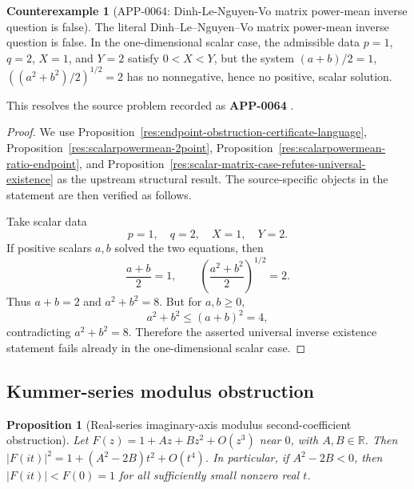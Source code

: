 \documentclass[11pt]{article}
\numberwithin{equation}{section}
\newtheorem{proposition}[theorem]{Proposition}
\theoremstyle{definition}
\newtheorem{counterexample}[theorem]{Counterexample}
\theoremstyle{remark}
\newcommand{\1}{\mathbf 1}
\begin{document}
\begin{counterexample}[APP-0064: Dinh-Le-Nguyen-Vo matrix power-mean inverse question is false]
\label{res:dlnv-matrixpowermeaninverse-scalarrefutation}
The literal Dinh--Le--Nguyen--Vo matrix power-mean inverse question is false. In the one-dimensional scalar case, the admissible data \(p=1\), \(q=2\), \(X=1\), and \(Y=2\) satisfy \(0<X<Y\), but the system \((a+b)/2=1\), \(((a^2+b^2)/2)^{1/2}=2\) has no nonnegative, hence no positive, scalar solution.



This resolves the source problem recorded as \textbf{APP-0064} \cite{app-app-0064-source}.
\end{counterexample}

\begin{proof}
We use Proposition~\ref{res:endpoint-obstruction-certificate-language}, Proposition~\ref{res:scalarpowermean-2point}, Proposition~\ref{res:scalarpowermean-ratio-endpoint}, and Proposition~\ref{res:scalar-matrix-case-refutes-universal-existence} as the upstream structural result. The source-specific objects in the statement are then verified as follows.

Take scalar data
\[
p=1,
\quad q=2,
\quad X=1,
\quad Y=2.
\]
If positive scalars \(a,b\) solved the two equations, then
\[
\frac{a+b}{2}=1,
\qquad
\left(\frac{a^2+b^2}{2}\right)^{1/2}=2.
\]
Thus \(a+b=2\) and \(a^2+b^2=8\). But for \(a,b\ge0\),
\[
a^2+b^2\le (a+b)^2=4,
\]
contradicting \(a^2+b^2=8\). Therefore the asserted universal inverse existence statement fails already in the one-dimensional scalar case.
\end{proof}

\subsection{Kummer-series modulus obstruction}
\begin{proposition}[Real-series imaginary-axis modulus second-coefficient obstruction]
\label{res:realseries-imagaxis-modulus-secondcoefficient-obstruction}
Let \(F(z)=1+Az+Bz^2+O(z^3)\) near \(0\), with \(A,B\in\mathbb R\). Then \(|F(it)|^2=1+(A^2-2B)t^2+O(t^4)\). In particular, if \(A^2-2B<0\), then \(|F(it)|<F(0)=1\) for all sufficiently small nonzero real \(t\).
\end{proposition}
\end{document}
